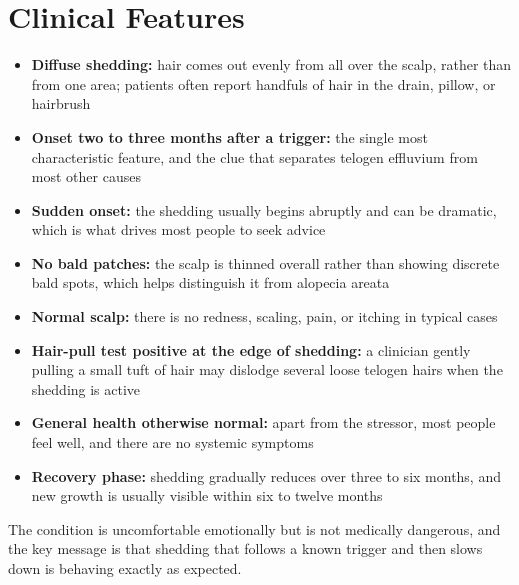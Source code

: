 \section*{Clinical Features}
\begin{itemize}
    \item \textbf{Diffuse shedding:} hair comes out evenly from all over the scalp, rather than from one area; patients often report handfuls of hair in the drain, pillow, or hairbrush
    \item \textbf{Onset two to three months after a trigger:} the single most characteristic feature, and the clue that separates telogen effluvium from most other causes
    \item \textbf{Sudden onset:} the shedding usually begins abruptly and can be dramatic, which is what drives most people to seek advice
    \item \textbf{No bald patches:} the scalp is thinned overall rather than showing discrete bald spots, which helps distinguish it from alopecia areata
    \item \textbf{Normal scalp:} there is no redness, scaling, pain, or itching in typical cases
    \item \textbf{Hair-pull test positive at the edge of shedding:} a clinician gently pulling a small tuft of hair may dislodge several loose telogen hairs when the shedding is active
    \item \textbf{General health otherwise normal:} apart from the stressor, most people feel well, and there are no systemic symptoms
    \item \textbf{Recovery phase:} shedding gradually reduces over three to six months, and new growth is usually visible within six to twelve months
\end{itemize}

The condition is uncomfortable emotionally but is not medically dangerous, and the key message is that shedding that follows a known trigger and then slows down is behaving exactly as expected.

